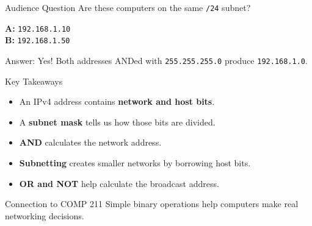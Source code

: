 \documentclass[aspectratio=169,11pt]{beamer}
\begin{document}
\begin{frame}{Audience Question}
\Large Are these computers on the same \texttt{/24} subnet?\par\vspace{0.45cm}
\begin{center}
\Large \textbf{A:} \texttt{192.168.1.10}\\[0.3cm]
\Large \textbf{B:} \texttt{192.168.1.50}
\end{center}
\vspace{0.5cm}
\pause
\begin{block}{Answer: Yes!}
Both addresses ANDed with \texttt{255.255.255.0} produce \texttt{192.168.1.0}.
\end{block}
\end{frame}

\begin{frame}{Key Takeaways}
\begin{itemize}
\setlength{\itemsep}{0.55em}
\item An IPv4 address contains \textbf{network and host bits}.
\item A \textbf{subnet mask} tells us how those bits are divided.
\item \textbf{AND} calculates the network address.
\item \textbf{Subnetting} creates smaller networks by borrowing host bits.
\item \textbf{OR and NOT} help calculate the broadcast address.
\end{itemize}
\vspace{0.35cm}
\begin{block}{Connection to COMP 211}
Simple binary operations help computers make real networking decisions.
\end{block}
\end{frame}
\end{document}
